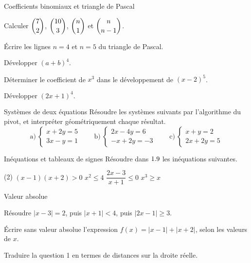\begin{exercice}[1]{Coefficients binomiaux et triangle de Pascal}
\begin{questions}
  \item Calculer $\dbinom{7}{2}$, $\dbinom{10}{3}$, $\dbinom{n}{1}$ et $\dbinom{n}{n-1}$.
  \item Écrire les lignes $n=4$ et $n=5$ du triangle de Pascal.
  \item Développer $(a+b)^{4}$.
  \item Déterminer le coefficient de $x^{3}$ dans le développement de $(x-2)^{5}$.
  \item Développer $(2x+1)^{4}$.
\end{questions}
\end{exercice}

\begin{exercice}[1]{Systèmes de deux équations}
Résoudre les systèmes suivants par l'algorithme du pivot, et interpréter
géométriquement chaque résultat.
\[
  \text{a)}\ \begin{cases} x+2y=5\\ 3x-y=1 \end{cases}
  \qquad
  \text{b)}\ \begin{cases} 2x-4y=6\\ -x+2y=-3 \end{cases}
  \qquad
  \text{c)}\ \begin{cases} x+y=2\\ 2x+2y=5 \end{cases}
\]
\end{exercice}

\begin{exercice}[1]{Inéquations et tableaux de signes}
Résoudre dans $1.9$ les inéquations suivantes.
\begin{tasks}(2)
  \task $(x-1)(x+2)>0$
  \task $x^{2}\leq4$
  \task $\dfrac{2x-3}{x+1}\leq0$
  \task $x^{3}\geq x$
\end{tasks}
\end{exercice}

\begin{exercice}[1]{Valeur absolue}
\begin{questions}
  \item Résoudre $|x-3|=2$, puis $|x+1|<4$, puis $|2x-1|\geq3$.
  \item Écrire sans valeur absolue l'expression $f(x)=|x-1|+|x+2|$, selon les valeurs de $x$.
  \item Traduire la question 1 en termes de distances sur la droite réelle.
\end{questions}
\end{exercice}

